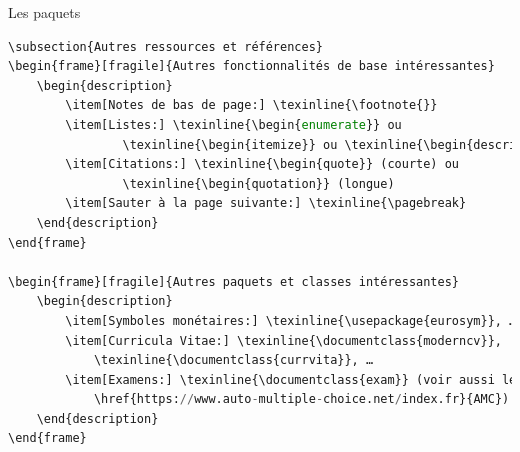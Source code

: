 \documentclass[usenames,dvipsnames,10pt]{beamer} %
\begin{document}
\begin{frame}[fragile]{Les paquets}
\begin{description}
{\begin{lstlisting}[language=Python]
\subsection{Autres ressources et références}
\begin{frame}[fragile]{Autres fonctionnalités de base intéressantes}
    \begin{description}
        \item[Notes de bas de page:] \texinline{\footnote{}}
        \item[Listes:] \texinline{\begin{enumerate}} ou
                \texinline{\begin{itemize}} ou \texinline{\begin{description}}
        \item[Citations:] \texinline{\begin{quote}} (courte) ou
                \texinline{\begin{quotation}} (longue)
        \item[Sauter à la page suivante:] \texinline{\pagebreak}
    \end{description}
\end{frame}

\begin{frame}[fragile]{Autres paquets et classes intéressantes}
    \begin{description}
        \item[Symboles monétaires:] \texinline{\usepackage{eurosym}}, …
        \item[Curricula Vitae:] \texinline{\documentclass{moderncv}},
            \texinline{\documentclass{currvita}}, …
        \item[Examens:] \texinline{\documentclass{exam}} (voir aussi le logiciel
            \href{https://www.auto-multiple-choice.net/index.fr}{AMC}).
    \end{description}
\end{frame}


\end{lstlisting}}
\end{description}
\end{frame}
\end{document}
